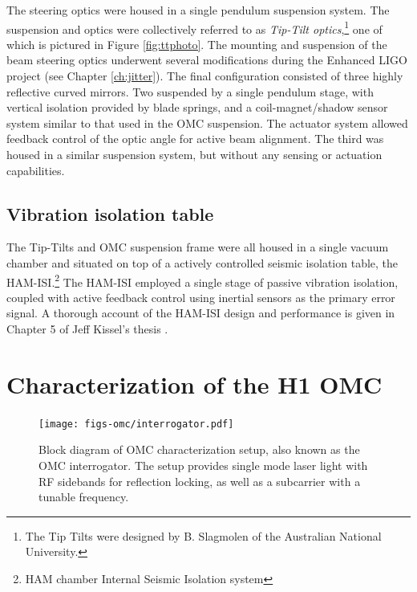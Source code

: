 The steering optics were housed in a single pendulum suspension system. %
The suspension and optics were collectively referred to as \emph{Tip-Tilt optics},\footnote{The Tip Tilts were designed by B. %
Slagmolen of the Australian National University\cite{T0900096}.} one of which is pictured in Figure \ref{fig:ttphoto}. %
The mounting and suspension of the beam steering optics underwent several modifications during the Enhanced LIGO project (see Chapter \ref{ch:jitter}). %
The final configuration consisted of three highly reflective curved mirrors. %
Two suspended by a single pendulum stage, with vertical isolation provided by blade springs, and a coil-magnet/shadow sensor system similar to that used in the OMC suspension. %
The actuator system allowed feedback control of the optic angle for active beam alignment. %
The third was housed in a similar suspension system, but without any sensing or actuation capabilities.

\subsection{Vibration isolation table}
The Tip-Tilts and OMC suspension frame were all housed in a single vacuum chamber and situated on top of a actively controlled seismic isolation table, the HAM-ISI.\footnote{HAM chamber Internal Seismic Isolation system} The HAM-ISI employed a single stage of passive vibration isolation, coupled with active feedback control using inertial sensors as the primary error signal. %
A thorough account of the HAM-ISI design and performance is given in Chapter 5 of Jeff Kissel's thesis \cite{kisselthesis}.

\section{Characterization of the H1 OMC}
\begin{figure}
  \begin{center}
  \leavevmode
  \texttt{[image: figs-omc/interrogator.pdf]}
  \end{center}
  \caption[Block diagram of OMC characterization setup.]{Block diagram of OMC characterization setup, also known as the OMC interrogator. The setup provides single mode laser light with RF sidebands for reflection locking, as well as a subcarrier with a tunable frequency.}
  \label{fig:interrogator}
\end{figure}


